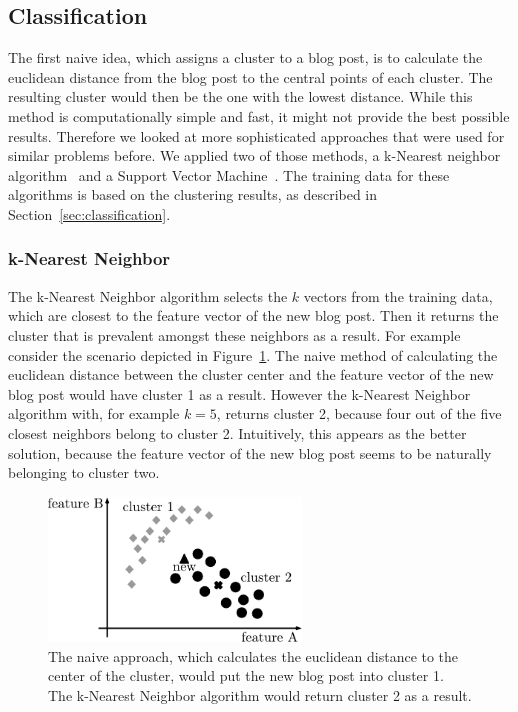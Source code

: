 \subsection{Classification}
\label{sec:impl_classification}


The first naive idea, which assigns a cluster to a blog post, is to calculate the euclidean distance from the blog post to the central points of each cluster.
The resulting cluster would then be the one with the lowest distance.
While this method is computationally simple and fast, it might not provide the best possible results.
Therefore we looked at more sophisticated approaches that were used for similar problems before.
We applied two of those methods, a k-Nearest neighbor algorithm~\cite{peterson2009k} and a Support Vector Machine~\cite{kolari2006svms}.
The training data for these algorithms is based on the clustering results, as described in Section~\ref{sec:classification}.


\subsubsection{k-Nearest Neighbor}
\label{sec:k_nearest_neighbor}


The k-Nearest Neighbor algorithm selects the $k$ vectors from the training data, which are closest to the feature vector of the new blog post.
Then it returns the cluster that is prevalent amongst these neighbors as a result.
For example consider the scenario depicted in Figure~\ref{fig:naive}.
The naive method of calculating the euclidean distance between the cluster center and the feature vector of the new blog post would have cluster 1 as a result.
However the k-Nearest Neighbor algorithm with, for example $k=5$, returns cluster 2, because four out of the five closest neighbors belong to cluster 2.
Intuitively, this appears as the better solution, because the feature vector of the new blog post seems to be naturally belonging to cluster two.


\begin{figure}[h]
    \centering
    \includegraphics[width=0.6\textwidth]{images/naive.pdf}
    \caption{The naive approach, which calculates the euclidean distance to the center of the cluster, would put the new blog post into cluster 1. The k-Nearest Neighbor algorithm would return cluster 2 as a result.}
    \label{fig:naive}
\end{figure}


